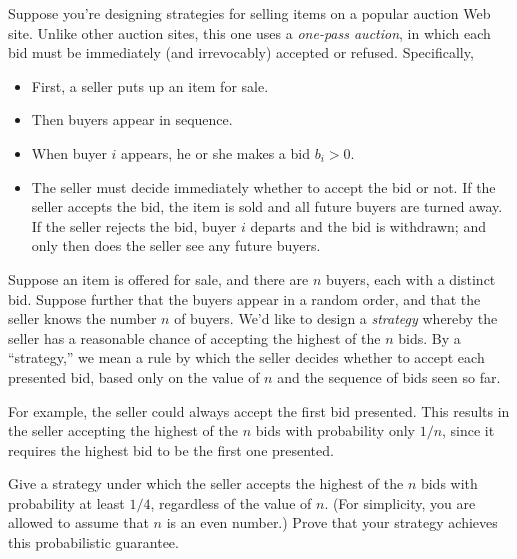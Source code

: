 \documentclass[12pt]{article}
\begin{document}
\begin{enumerate}
Suppose you're designing strategies for
selling items on a popular auction Web site.
Unlike other auction sites,
this one uses a {\em one-pass auction},
in which each bid must be immediately (and irrevocably)
accepted or refused.
Specifically,
\begin{itemize}
\item First, a seller puts up an item for sale.
\item Then buyers appear in sequence.
\item When buyer $i$ appears, he or she makes a bid $b_i > 0$.
\item The seller must decide immediately whether
to accept the bid or not.
If the seller accepts the bid, the item is sold and
all future buyers are turned away.
If the seller rejects the bid, buyer $i$
departs and the bid is withdrawn; and only
then does the seller see any future buyers.
\end{itemize}

Suppose an item is offered for sale, and there
are $n$ buyers, each with a distinct bid.
Suppose further that the buyers appear in a random order, and that
the seller knows the number $n$ of buyers.
We'd like to design a {\em strategy} whereby the
seller has a reasonable chance of accepting the highest of
the $n$ bids.
By a ``strategy,'' we mean a rule by which the
seller decides whether to accept each presented bid,
based only on the value of $n$ and the sequence of bids seen so far.

For example, the seller could always accept the first bid presented.
This results in the seller accepting the highest of the $n$ bids
with probability only $1/n$, since it requires the highest
bid to be the first one presented.

Give a strategy under which the seller accepts the
highest of the $n$ bids with probability at least $1/4$,
regardless of the value of $n$.
(For simplicity, you are allowed to assume that $n$ is an even number.)
Prove that your strategy achieves this probabilistic guarantee.

\end{enumerate}
\end{document}
